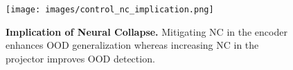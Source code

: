 
\begin{figure}[h]
    \centering
    \texttt{[image: images/control\_nc\_implication.png]}
  \caption{\textbf{Implication of Neural Collapse.} %
  Mitigating NC in the encoder enhances OOD generalization whereas increasing NC in the projector improves OOD detection.} 
  \label{fig:nc_implication}
  \vspace{-0.12in}
\end{figure}

